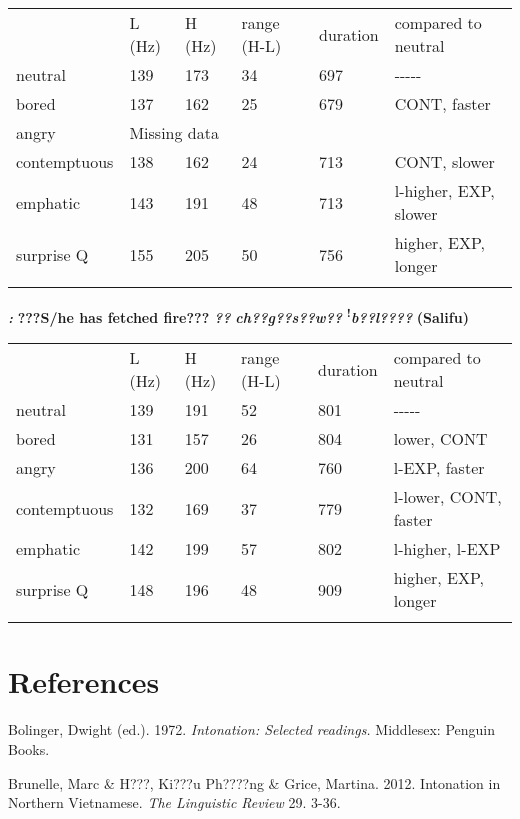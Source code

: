 \documentclass[output=paper]{langsci/langscibook}
\begin{document}
\begin{tabular}{llllll} & L (Hz) & H (Hz) & range (H-L) & duration & compared to neutral\\
\lsptoprule
neutral & 139 & 173 & 34 & 697 & {}-{}-{}-{}-{}-\\
bored & 137 & 162 & 25 & 679 & CONT, faster\\
angry & \multicolumn{5}{l}{ Missing data}\\
contemptuous & 138 & 162 & 24 & 713 & CONT, slower\\
emphatic & 143 & 191 & 48 & 713 & l-higher, EXP, slower\\
surprise Q & 155 & 205 & 50 & 756 & higher, EXP, longer\\
\lspbottomrule
\end{tabular}
\emph{\textbf{\textup{:}}}\textbf{  ???S}\textbf{/he has fetched fire???  }\emph{\textbf{??}}\emph{\textbf{ ch??g??s??}}\emph{\textbf{w??}}\emph{\textbf{ }}\textbf{\textsuperscript{!}}\emph{\textbf{b??l????}}\textbf{  (Salifu)}

\begin{tabular}{llllll} & L (Hz) & H (Hz) & range (H-L) & duration & compared to neutral\\
\lsptoprule
neutral & 139 & 191 & 52 & 801 & {}-{}-{}-{}-{}-\\
bored & 131 & 157 & 26 & 804 & lower, CONT\\
angry & 136 & 200 & 64 & 760 & l-EXP, faster\\
contemptuous & 132 & 169 & 37 & 779 & l-lower, CONT, faster\\
emphatic & 142 & 199 & 57 & 802 & l-higher, l-EXP\\
surprise Q & 148 & 196 & 48 & 909 & higher, EXP, longer\\
\lspbottomrule
\end{tabular}
\section{References}
\begin{styleBibliographyiv}
Bolinger, Dwight (ed.). 1972. \textit{Intonation: Selected readings. }Middlesex: Penguin Books.
\end{styleBibliographyiv}

\begin{styleBibliographyiv}
Brunelle, Marc \& H???, Ki???u Ph????ng \& Grice, Martina. 2012. Intonation in Northern Vietnamese. \textit{The Linguistic Review} 29. 3-36. 
\end{styleBibliographyiv}
\end{document}
